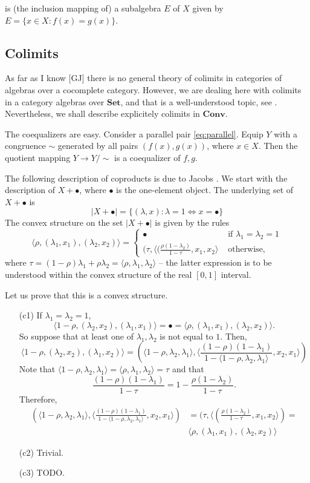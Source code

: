 \documentclass[12pt,letterpaper]{article}
\newcommand{\ct}[1]{\mathbf{#1}}
\newcommand{\<}{\langle}
\def\>{\rangle}
\begin{document}
is (the inclusion mapping of) a subalgebra $E$ of $X$ given by
$E=\{x\in X\colon f(x)=g(x)\}$.

\subsection{Colimits}

As far as I know [GJ] there is no general theory of colimits in categories of algebras over a
cocomplete category. However, we are dealing here with colimits in a category algebras over $\ct{Set}$, and
that is a well-understood topic, see \cite{...}. Nevertheless, we shall 
describe explicitely colimits
in $\ct{Conv}$. 

The coequalizers are easy. Consider a parallel pair \eqref{eq:parallel}. Equip
$Y$ with a congruence $\sim$ generated by all pairs $(f(x),g(x))$, where $x\in X$.
Then the quotient mapping $Y\to Y/\sim$ is a coequalizer of $f,g$.

The following description of coproducts is due to Jacobs \cite{...}. We start with the
description of $X+\bullet$, where $\bullet$ is the one-element object. The underlying
set of $X+\bullet$ is
$$
|X+\bullet|=\{(\lambda,x)\colon \lambda=1\Leftrightarrow x=\bullet\}
$$
The convex structure on the set $|X+\bullet|$ is given by the rules
$$
\<\rho,(\lambda_1,x_1),(\lambda_2,x_2)\>=
\begin{cases}
\bullet & \text{ if $\lambda_1=\lambda_2=1$}\\
(\tau,\<(\frac{\rho(1-\lambda_2)}{1-\tau},x_1,x_2\>& \text{ otherwise,}
\end{cases}
$$
where $\tau=(1-\rho)\lambda_1+\rho\lambda_2=\<\rho,\lambda_1,\lambda_2\>$ -- the
latter expression is to be understood within the convex structure of the real $[0,1]$
interval.

Let us prove that this is a convex structure.
\begin{enumerate}
\item[(c1)]
If $\lambda_1=\lambda_2=1$, 
$$
\< 1-\rho,(\lambda_2,x_2),(\lambda_1,x_1)\>=\bullet=\<\rho,(\lambda_1,x_1),(\lambda_2,x_2)\>.
$$
So suppose that at least one of $\lambda_1,\lambda_2$ is not equal to $1$.
Then,
$$
\<1-\rho,(\lambda_2,x_2),(\lambda_1,x_2)\>=
	(\<1-\rho,\lambda_2,\lambda_1\>,
		\<\frac{(1-\rho)(1-\lambda_1)}{1-\<1-\rho,\lambda_2,\lambda_1\>},x_2,x_1\>)
$$
Note that $\<1-\rho,\lambda_2,\lambda_1\>=\<\rho,\lambda_1,\lambda_2\>=\tau$ and that
$$
\frac{(1-\rho)(1-\lambda_1)}{1-\tau}=
1-\frac{\rho(1-\lambda_2)}{1-\tau}.
$$
Therefore,
\begin{align*}
	(\<1-\rho,\lambda_2,\lambda_1\>,
		\<\frac{(1-\rho)(1-\lambda_1)}{1-\<1-\rho,\lambda_2,\lambda_1\>},x_2,x_1\>)&=
	(\tau,\<(\frac{\rho(1-\lambda_2)}{1-\tau},x_1,x_2\>)=\\
	&\<\rho,(\lambda_1,x_1),(\lambda_2,x_2)\>
\end{align*}
\item[(c2)] Trivial.
\item[(c3)] TODO.
\end{enumerate}
\end{document}
